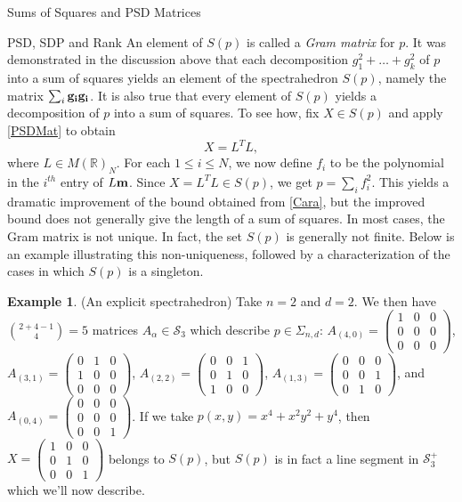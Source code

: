 \documentclass[12pt,oneside,final]{ucthesisucsbmath2010}
\newcommand{\R}{\mathbb{R}}
\newcommand{\s}{\mathcal{S}}
\newcommand{\snd}{\Sigma_{n,d}}
\theoremstyle{definition}
\newtheorem{examp}[thm]{Example}
\begin{document}
\begin{chapter}{Sums of Squares and PSD Matrices}
\begin{section}{PSD, SDP and Rank}
An element of $S(p)$ is called a \emph{Gram matrix} for $p$. It was demonstrated in the discussion above that each decomposition $g_1^2+\ldots+g_k^2$ of $p$ into a sum of squares yields an element of the spectrahedron $S(p)$, namely the matrix $\sum_i{\bf g_i}{\bf g_i}$. It is also true that every element of $S(p)$ yields a decomposition of $p$ into a sum of squares. To see how, fix $X \in S(p)$ and apply \ref{PSDMat} to obtain
\[X = L^TL,\]
where $L\in M(\R)_N$. For each $1\leq i\leq N$, we now define $f_i$ to be the polynomial in the $i^{th}$ entry of $L{\bf m}$. Since $X = L^TL \in S(p)$, we get $p = \sum_if_i^2$. This yields a dramatic improvement of the bound obtained from \ref{Cara}, but the improved bound does not generally give the length of a sum of squares. In most cases, the Gram matrix is not unique. In fact, the set $S(p)$ is generally not finite. Below is an example illustrating this non-uniqueness, followed by a characterization of the cases in which $S(p)$ is a singleton. 

\begin{examp}(An explicit spectrahedron) Take $n=2$ and $d=2$. We then have $\binom{2+4-1}{4} = 5$ matrices $A_\alpha \in \s_3$ which describe $p \in \snd$: $A_{(4,0)}=\left(\begin{smallmatrix} 1 & 0 & 0 \\0 & 0 & 0\\0&0&0 \end{smallmatrix}\right)$,  $A_{(3,1)}=\left(\begin{smallmatrix} 0 & 1 & 0 \\1 & 0 & 0\\0&0&0 \end{smallmatrix}\right)$, $A_{(2,2)}=\left(\begin{smallmatrix} 0 & 0 & 1 \\0 & 1 & 0\\1&0&0 \end{smallmatrix}\right)$, $A_{(1,3)} = \left(\begin{smallmatrix} 0 & 0 & 0 \\0 & 0 & 1\\0&1&0 \end{smallmatrix}\right)$, and $A_{(0,4)}=\left(\begin{smallmatrix} 0 & 0 & 0 \\0 & 0 & 0\\0&0&1 \end{smallmatrix}\right)$. If we take $p(x,y) = x^4+x^2y^2+y^4$, then $X = \left(\begin{smallmatrix} 1 & 0 & 0 \\0 & 1 & 0\\0&0&1 \end{smallmatrix}\right)$ belongs to $S(p)$, but $S(p)$ is in fact a line segment in $\s_3^+$ which we'll now describe.


\end{examp}
\end{section}
\end{chapter}
\end{document}
